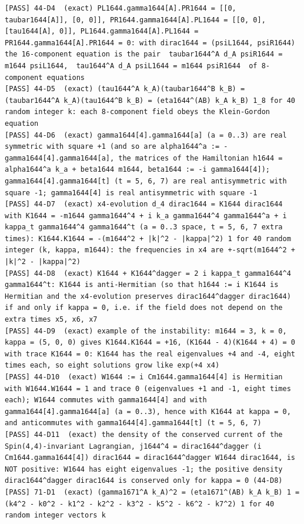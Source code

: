 \documentclass[
  10pt,
]{article}
\begin{document}
\begin{verbatim}
[PASS] 44-D4  (exact) PL1644.gamma1644[A].PR1644 = [[0, taubar1644[A]], [0, 0]], PR1644.gamma1644[A].PL1644 = [[0, 0], [tau1644[A], 0]], PL1644.gamma1644[A].PL1644 = PR1644.gamma1644[A].PR1644 = 0: with dirac1644 = (psiL1644, psiR1644) the 16-component equation is the pair  taubar1644^A d_A psiR1644 = m1644 psiL1644,  tau1644^A d_A psiL1644 = m1644 psiR1644  of 8-component equations
[PASS] 44-D5  (exact) (tau1644^A k_A)(taubar1644^B k_B) = (taubar1644^A k_A)(tau1644^B k_B) = (eta1644^(AB) k_A k_B) 1_8 for 40 random integer k: each 8-component field obeys the Klein-Gordon equation
[PASS] 44-D6  (exact) gamma1644[4].gamma1644[a] (a = 0..3) are real symmetric with square +1 (and so are alpha1644^a := -gamma1644[4].gamma1644[a], the matrices of the Hamiltonian h1644 = alpha1644^a k_a + beta1644 m1644, beta1644 := -i gamma1644[4]); gamma1644[4].gamma1644[t] (t = 5, 6, 7) are real antisymmetric with square -1; gamma1644[4] is real antisymmetric with square -1
[PASS] 44-D7  (exact) x4-evolution d_4 dirac1644 = K1644 dirac1644 with K1644 = -m1644 gamma1644^4 + i k_a gamma1644^4 gamma1644^a + i kappa_t gamma1644^4 gamma1644^t (a = 0..3 space, t = 5, 6, 7 extra times): K1644.K1644 = -(m1644^2 + |k|^2 - |kappa|^2) 1 for 40 random integer (k, kappa, m1644): the frequencies in x4 are +-sqrt(m1644^2 + |k|^2 - |kappa|^2)
[PASS] 44-D8  (exact) K1644 + K1644^dagger = 2 i kappa_t gamma1644^4 gamma1644^t: K1644 is anti-Hermitian (so that h1644 := i K1644 is Hermitian and the x4-evolution preserves dirac1644^dagger dirac1644) if and only if kappa = 0, i.e. if the field does not depend on the extra times x5, x6, x7
[PASS] 44-D9  (exact) example of the instability: m1644 = 3, k = 0, kappa = (5, 0, 0) gives K1644.K1644 = +16, (K1644 - 4)(K1644 + 4) = 0 with trace K1644 = 0: K1644 has the real eigenvalues +4 and -4, eight times each, so eight solutions grow like exp(+4 x4)
[PASS] 44-D10  (exact) W1644 := i Cm1644.gamma1644[4] is Hermitian with W1644.W1644 = 1 and trace 0 (eigenvalues +1 and -1, eight times each); W1644 commutes with gamma1644[4] and with gamma1644[4].gamma1644[a] (a = 0..3), hence with K1644 at kappa = 0, and anticommutes with gamma1644[4].gamma1644[t] (t = 5, 6, 7)
[PASS] 44-D11  (exact) the density of the conserved current of the Spin(4,4)-invariant Lagrangian, j1644^4 = dirac1644^dagger (i Cm1644.gamma1644[4]) dirac1644 = dirac1644^dagger W1644 dirac1644, is NOT positive: W1644 has eight eigenvalues -1; the positive density dirac1644^dagger dirac1644 is conserved only for kappa = 0 (44-D8)
[PASS] 71-D1  (exact) (gamma1671^A k_A)^2 = (eta1671^(AB) k_A k_B) 1 = (k4^2 - k0^2 - k1^2 - k2^2 - k3^2 - k5^2 - k6^2 - k7^2) 1 for 40 random integer vectors k

\end{verbatim}
\end{document}

